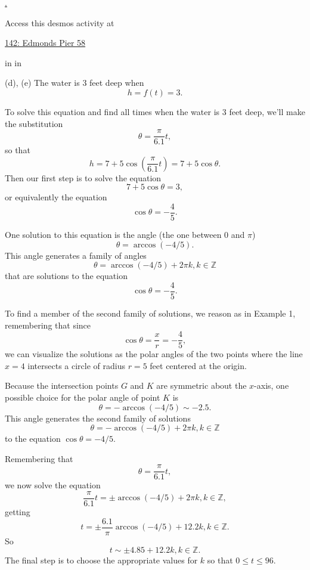 \documentclass{ximera}
\newcommand{\pskip}{\vskip 0.1 in}
\begin{document}
\begin{example}
\begin{explanation}
{\href{https://www.desmos.com/calculator/3w56sayz2h}.
}
 
\begin{onlineOnly}
    \begin{center}
\end{center}
\end{onlineOnly}
  
Access this desmos activity at
 
\href{https://www.desmos.com/calculator/bab6apch7i}{142: Edmonds Pier 58}


\pskip \pskip

(d), (e) The water is $3$ feet deep when
\[
   h = f(t) =3.
\]

To solve this equation and find all times when the water is $3$ feet deep, we'll make the substitution
\[
    \theta = \frac{\pi}{6.1}t ,
\]
so that
\[
     h = 7 + 5 \cos \left( \frac{\pi}{6.1}t  \right) = 7 + 5\cos\theta.
\]  
Then our first step is to solve the equation 
\[
  7 + 5\cos\theta = 3 ,
\]
or equivalently the equation
\[
   \cos \theta = -\frac{4}{5} .
\]

One solution to this equation is the angle (the one between $0$ and $\pi$)
\[
   \theta = \arccos(-4/5) .
\]
This angle generates a family of angles
\[
    \theta = \arccos(-4/5)  + 2\pi k, k\in \mathbb{Z}
\]
that are solutions to the equation 
\[
   \cos\theta = -\frac{4}{5} .
\]

To find a member of the second family of solutions, we reason as in Example 1, remembering that since
\[
\cos\theta = \frac{x}{r}   = -\frac{4}{5} ,
\] 
we can visualize the solutions as the polar angles of the two points where the line $x=4$ intersects a circle of radius $r=5$ feet centered at the origin. 

\begin{onlineOnly}
    \begin{center}
\end{center}
\end{onlineOnly}

Because the intersection points $G$ and $K$ are symmetric about the $x$-axis, one possible choice for the polar angle of point $K$ is
\[
   \theta=  - \arccos(-4/5) \sim -2.5 .
\]
This angle generates the second family of solutions
\[
  \theta = -\arccos(-4/5)  + 2\pi k, k\in \mathbb{Z}
\]
to the equation $\cos\theta = -4/5$.

Remembering that
\[
  \theta =  \frac{\pi}{6.1}t ,
\]
we now solve the equation
\[
     \frac{\pi}{6.1}t = \pm \arccos(-4/5)  + 2\pi k , k\in \mathbb{Z},
\]
getting
\[
   t = \pm \frac{6.1}{\pi} \arccos(-4/5) + 12.2 k , k\in \mathbb{Z}.
\]
So
\[
      t  \sim \pm 4.85 + 12.2 k , k\in \mathbb{Z}.
\]
The final step is to choose the appropriate values for $k$ so that $0\leq t \leq 96$.


\end{explanation}
\end{example}
\end{document}
